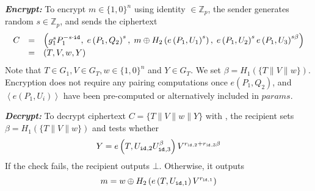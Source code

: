 \begin{algorithm}
\begin{description}
\item \textbf{\textit{Encrypt:}} To encrypt $m \in \{ 1, 0 \}^n$ using identity \id{} $\in \mathbb{Z}_p$, the sender generates random $s \in \mathbb{Z}_p$, and sends the ciphertext
\begin{equation*}
 \begin{array}{lcl}
  C & = & \left( g_{1}^{s}P_1^{-s\cdot\mathtt{id}_{}}, \; e \left( P_1, Q_2\right)^s, \; m \oplus H_2 \left( e \left( P_1, U_1 \right)^s \right), \; e \left( P_1, U_2 \right)^s e \left( P_1, U_3\right)^{s \beta} \right) \\ & = & \left( T, V, w, Y \right)
 \end{array}
\end{equation*}
Note that $T \in G_1, V \in G_T,  w \in \{ 1, 0 \}^n$ and $Y \in G_T$. We set $\beta = H_1 \left( \{ T \parallel V \parallel w \} \right)$. Encryption does not require any pairing computations once $e \left( P_1, Q_2 \right)$, and $\left< e \left( P_1, U_i \right) \right>$ have been pre-computed or alternatively included in $params$.

\item \textbf{\textit{Decrypt:}} To decrypt ciphertext $C = \{ T \parallel V \parallel w \parallel Y \}$ with \id{}, the recipient sets $\beta=H_1 \left( \{ T \parallel V \parallel w \} \right)$ and tests whether
\begin{equation*}
 Y = e \left( T, U_{\mathtt{id}_{}, 2}U_{\mathtt{id}_{}, 3}^{\beta} \right)V^{r_{\mathtt{id}_{},2}+r_{\mathtt{id}_{},3}\beta}
\end{equation*}
If the check fails, the recipient outputs $\bot$. Otherwise, it outputs
\begin{equation*}
 m = w \oplus H_2 \left( e \left( T, U_{\mathtt{id}_{}, 1} \right) V^{r_{\mathtt{id}_{}, 1}} \right)
\end{equation*}

\end{description}
\end{algorithm}

